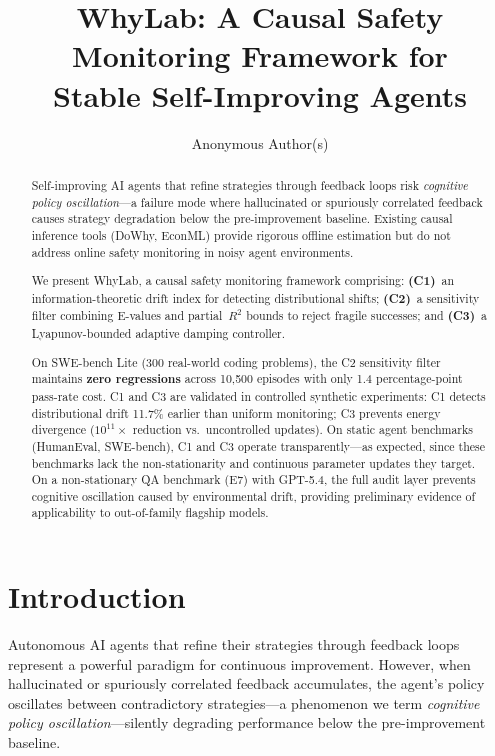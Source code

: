 \documentclass{article}
\title{WhyLab: A Causal Safety Monitoring Framework for\\
Stable Self-Improving Agents}
\author{
  Anonymous Author(s)
}
\begin{document}
\maketitle

\begin{abstract}
Self-improving AI agents that refine strategies through feedback loops
risk \emph{cognitive policy oscillation}---a failure mode where
hallucinated or spuriously correlated feedback causes strategy
degradation below the pre-improvement baseline. Existing causal
inference tools (DoWhy, EconML) provide rigorous offline estimation but
do not address online safety monitoring in noisy agent environments.

We present WhyLab, a causal safety monitoring framework comprising:
\textbf{(C1)}~an information-theoretic drift index for detecting
distributional shifts;
\textbf{(C2)}~a sensitivity filter combining E-values and
partial~$R^2$ bounds to reject fragile successes; and
\textbf{(C3)}~a Lyapunov-bounded adaptive damping controller.

On SWE-bench Lite (300 real-world coding problems), the C2 sensitivity
filter maintains \textbf{zero regressions} across 10{,}500 episodes
with only 1.4 percentage-point pass-rate cost. C1 and C3 are validated
in controlled synthetic experiments: C1 detects distributional drift
11.7\% earlier than uniform monitoring; C3 prevents energy divergence
($10^{11}\times$ reduction vs.\ uncontrolled updates).
On static agent benchmarks (HumanEval, SWE-bench), C1 and C3 operate
transparently---as expected, since these benchmarks lack the
non-stationarity and continuous parameter updates they target.
On a non-stationary QA benchmark (E7) with GPT-5.4,
the full audit layer prevents cognitive oscillation caused by
environmental drift, providing preliminary evidence of
applicability to out-of-family flagship models.
\end{abstract}


\section{Introduction}
\label{sec:intro}


Autonomous AI agents that refine their strategies through feedback
loops~\cite{shinn2023reflexion,yao2023react} represent a powerful
paradigm for continuous improvement. However, when hallucinated or
spuriously correlated feedback accumulates, the agent's policy
oscillates between contradictory strategies---a phenomenon we term
\emph{cognitive policy oscillation}---silently degrading performance
below the pre-improvement baseline.
\end{document}

